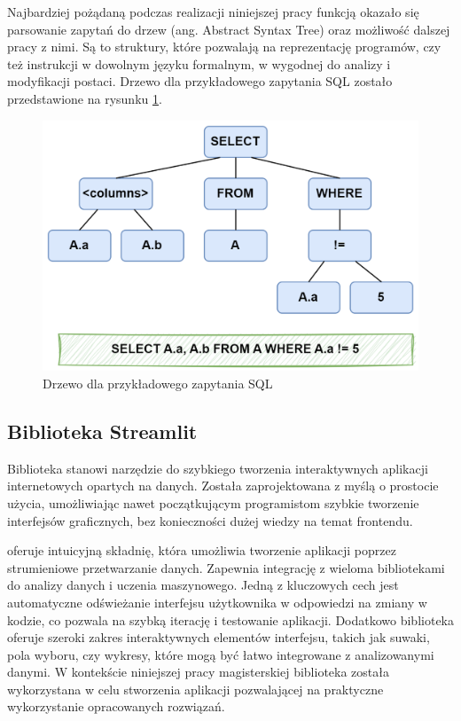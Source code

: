 Najbardziej pożądaną podczas realizacji niniejszej pracy funkcją okazało się parsowanie zapytań do drzew  (ang. Abstract Syntax Tree) oraz możliwość dalszej pracy z nimi. Są to struktury, które pozwalają na reprezentację programów, czy też instrukcji w dowolnym języku formalnym, w wygodnej do analizy i modyfikacji postaci. Drzewo  dla przykładowego zapytania SQL zostało przedstawione na rysunku \ref{fig:sql-ast-example}.

\begin{figure}[ht!]
  \centering
  \includegraphics[width=0.55\linewidth]{images/ast_example.png}
  \caption{Drzewo  dla przykładowego zapytania SQL}
  \label{fig:sql-ast-example}
\end{figure}

\subsection{Biblioteka Streamlit}
Biblioteka  stanowi narzędzie do szybkiego tworzenia interaktywnych aplikacji internetowych opartych na danych. Została zaprojektowana z myślą o prostocie użycia, umożliwiając nawet początkującym programistom szybkie tworzenie interfejsów graficznych, bez konieczności dużej wiedzy na temat frontendu. 

 oferuje intuicyjną składnię, która umożliwia tworzenie aplikacji poprzez strumieniowe przetwarzanie danych. Zapewnia integrację z wieloma bibliotekami do analizy danych i uczenia maszynowego. Jedną z kluczowych cech  jest automatyczne odświeżanie interfejsu użytkownika w odpowiedzi na zmiany w kodzie, co pozwala na szybką iterację i testowanie aplikacji. Dodatkowo biblioteka oferuje szeroki zakres interaktywnych elementów interfejsu, takich jak suwaki, pola wyboru, czy wykresy, które mogą być łatwo integrowane z analizowanymi danymi. W kontekście niniejszej pracy magisterskiej biblioteka  została wykorzystana w celu stworzenia aplikacji pozwalającej na praktyczne wykorzystanie opracowanych rozwiązań.

